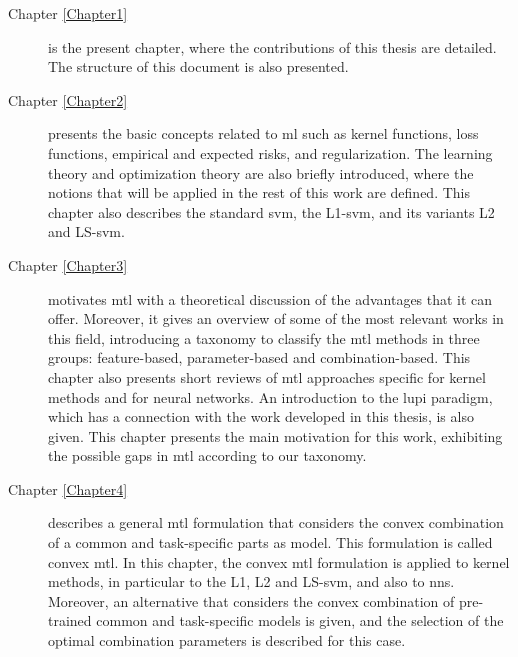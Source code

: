 \begin{description}

\item [{Chapter \ref{Chapter1}}] is the present chapter, where the contributions of this thesis are detailed. The structure of this document is also presented.

\item [{Chapter \ref{Chapter2}}] presents the basic concepts related to \acrshort{ml} such as kernel functions, loss functions, empirical and expected risks, and regularization. The learning theory and optimization theory are also briefly introduced, where the notions that will be applied in the rest of this work are defined. This chapter also describes the standard \acrshort{svm}, the L1-\acrshort{svm}, and its variants L2 and LS-\acrshort{svm}.

\item [{Chapter \ref{Chapter3}}] motivates \acrshort{mtl} with a theoretical discussion of the advantages that it can offer. Moreover, it gives an overview of some of the most relevant works in this field, introducing a taxonomy to classify the \acrshort{mtl} methods in three groups: feature-based, parameter-based and combination-based. This chapter also presents short reviews of \acrshort{mtl} approaches specific for kernel methods and for neural networks. An introduction to the \acrfull{lupi} paradigm, which has a connection with the work developed in this thesis, is also given. This chapter presents the main motivation for this work, exhibiting the possible gaps in \acrshort{mtl} according to our taxonomy.



\item [{ Chapter \ref{Chapter4}}] describes a general \acrshort{mtl} formulation that considers the convex combination of a common and task-specific parts as model. This formulation is called convex \acrshort{mtl}. In this chapter, the convex \acrshort{mtl} formulation is applied to kernel methods, in particular to the L1, L2 and LS-\acrshort{svm}, and also to \acrshort{nns}. Moreover, an alternative that considers the convex combination of pre-trained common and task-specific models is given, and the selection of the optimal combination parameters is described for this case.


\end{description}
